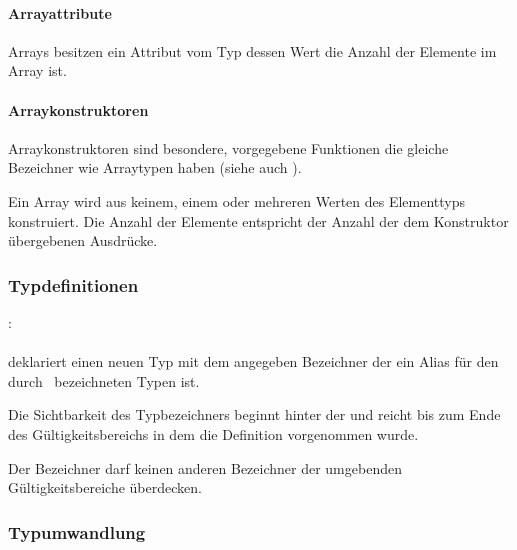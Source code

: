 \paragraph{Arrayattribute}\label{Arrayattribute}

Arrays besitzen ein Attribut  vom Typ  dessen Wert
die Anzahl der Elemente im Array ist.


\paragraph{Arraykonstruktoren}\label{Arraykonstruktoren}


Arraykonstruktoren sind besondere, vorgegebene Funktionen die gleiche Bezeichner wie Arraytypen haben
(siehe auch ).

Ein Array wird aus keinem, einem oder mehreren Werten des Elementtyps konstruiert.
Die Anzahl der Elemente entspricht der Anzahl der dem Konstruktor übergebenen Ausdrücke.

\subsubsection{Typdefinitionen}\label{Typdefinitionen}
:\label{typ_definition}\\
\hspace*{1cm}\Gspace{} \Gspace{}\\

 deklariert einen neuen Typ mit dem angegeben Bezeichner der ein Alias für den durch \glq{}\grq\ bezeichneten Typen ist.

Die Sichtbarkeit des Typbezeichners beginnt hinter der 
und reicht bis zum Ende des Gültigkeitsbereichs in dem die Definition vorgenommen wurde.

Der Bezeichner darf keinen anderen Bezeichner der umgebenden Gültigkeitsbereiche überdecken.


\subsubsection{Typumwandlung}\label{Typumwandlung}


